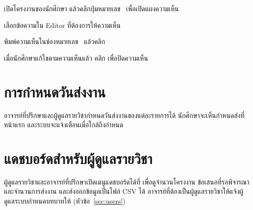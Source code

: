 \begin{steps}
  \item เปิดโครงงานของนักศึกษา แล้วคลิกปุ่มหมายเลข~ เพื่อเปิดแผงความเห็น
  \item เลือกข้อความใน Editor ที่ต้องการให้ความเห็น
  \item พิมพ์ความเห็นในช่องหมายเลข~ แล้วคลิก 
  \item เมื่อนักศึกษาแก้ไขตามความเห็นแล้ว คลิก  เพื่อปิดความเห็น
\end{steps}

\section{การกำหนดวันส่งงาน}

อาจารย์ที่ปรึกษาและผู้ดูแลรายวิชากำหนดวันส่งงานของแต่ละรายการได้
นักศึกษาจะเห็นกำหนดส่งที่หน้าแรก และระบบจะแจ้งเตือนเมื่อใกล้ถึงกำหนด


\section{แดชบอร์ดสำหรับผู้ดูแลรายวิชา}
\label{sec:dashboard}

ผู้ดูแลรายวิชาและอาจารย์ที่ปรึกษาเปิดเมนูแดชบอร์ดได้ที่  เพื่อดูจำนวนโครงงาน
ข้อเสนอที่รอพิจารณา และจำนวนการส่งงาน และส่งออกข้อมูลเป็นไฟล์ CSV ได้
อาจารย์ที่ต้องเป็นผู้ดูแลรายวิชาให้แจ้งผู้ดูแลระบบกำหนดบทบาทให้ (หัวข้อ~\ref{sec:users})
